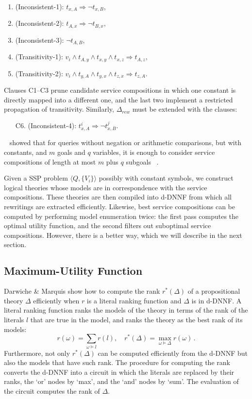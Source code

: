 \documentclass{llncs}
\newcommand{\denselist}{\topsep 0pt \itemsep -4pt}
\newcommand{\tup}[1]{\langle #1 \rangle}
\begin{document}
\begin{enumerate}[C1.]\denselist
\item (Inconsistent-1): $t_{x,A} \Rightarrow \neg t_{x,B}$,
\item (Inconsistent-2): $t_{A,x} \Rightarrow \neg t_{B,x}$,
\item (Inconsistent-3): $\neg t_{A,B}$,
\item (Transitivity-1): $v_i\land t_{A,y}\land t_{x,y}\land t_{x,z}\Rightarrow t_{A,z}$,
\item (Transitivity-2): $v_i\land t_{y,A}\land t_{y,x}\land t_{z,x}\Rightarrow t_{z,A}$.
\end{enumerate}
Clauses C1--C3 prune candidate service compositions in which one constant
is directly mapped into a different one, and the last two implement
a restricted propagation of transitivity.
Similarly, $\Delta_{rew}$ must be extended with the clauses:
\begin{enumerate}[C1.]\denselist
\item[C6.] (Inconsistent-4): $t^i_{x,A} \Rightarrow \neg t^j_{x,B}$.
\end{enumerate}
~\cite{RajaramanSU95} showed that for queries without negation or arithmetic comparisons,  but with constants, and $m$ goals and $q$ variables, it is enough
to consider service compositions of length at most  $m$ plus  $q$ subgoals ~\cite{Ullman00}.

Given a SSP problem $\tup{Q,\{V_i\}}$ possibly with constant 
symbols, we construct logical theories whose models are in
correspondence with the service compositions. These theories are then
compiled into d-DNNF from which all rewritings are extracted
efficiently.
Likewise, best service compositions can be computed by performing model
enumeration twice: the first pass computes the optimal utility function,
and the second filters out suboptimal service compositions.
However, there is a better way, which we will describe in the next section.

\subsection{Maximum-Utility Function}

Darwiche \& Marquis \cite{darwiche:weighted} show how to compute the
rank $r^*(\Delta)$ of a propositional theory $\Delta$
efficiently when $r$ is a literal ranking function and
$\Delta$ is in d-DNNF. A literal ranking function ranks
the models of the theory in terms of the rank of the
literals $l$ that are true in the model, and ranks the
theory as the best rank of its models:
\[ r(\omega) = \sum_{\omega\vDash l} r(l),\quad r^*(\Delta) = \max_{\omega\vDash\Delta} r(\omega)\,. \]
Furthermore, not only $r^*(\Delta)$ can be computed
efficiently from the d-DNNF but also the models that
have such rank.
The procedure for computing the rank converts the d-DNNF
into a circuit in which the literals are replaced by their
ranks, the `or' nodes by `max', and the `and' nodes by `sum'.
The evaluation of the circuit computes the rank of $\Delta$.
\end{document}
